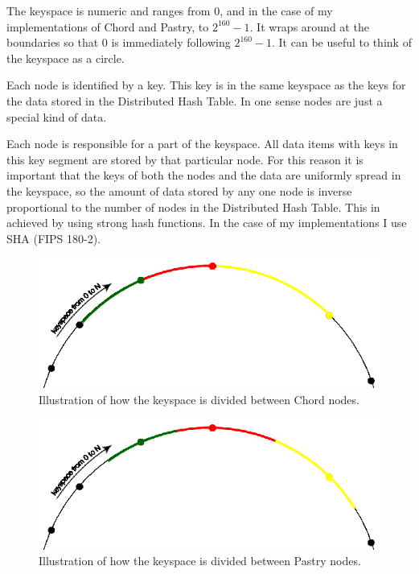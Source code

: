 The keyspace is numeric and ranges from 0, and in the case of my implementations of Chord and Pastry, to $2^{160} - 1$. It wraps around at the boundaries so that 0 is immediately following $2^{160} - 1 $. It can be useful to think of the keyspace as a circle.

Each node is identified by a key. This key is in the same keyspace as the keys for the data stored in the Distributed Hash Table. In one sense nodes are just a special kind of data.

Each node is responsible for a part of the keyspace. All data items with keys in this key segment are stored by that particular node. For this reason it is important that the keys of both the nodes and the data are uniformly spread in the keyspace, so the amount of data stored by any one node is inverse proportional to the number of nodes in the Distributed Hash Table. This in achieved by using strong hash functions. In the case of my implementations I use SHA (FIPS 180-2).

\begin{figure}[!htb]
\begin{center}
	\includegraphics[width=0.9\linewidth]{illustrations/ChordKeySpace.eps}
  \caption{Illustration of how the keyspace is divided between Chord nodes.}
  \label{keyspaceChord}
\end{center}
\end{figure}

\begin{figure}[!htb]
\begin{center}
	\includegraphics[width=0.9\linewidth]{illustrations/PastryKeySpace.eps}
  \caption{Illustration of how the keyspace is divided between Pastry nodes.}
  \label{keyspacePastry}
\end{center}
\end{figure}

